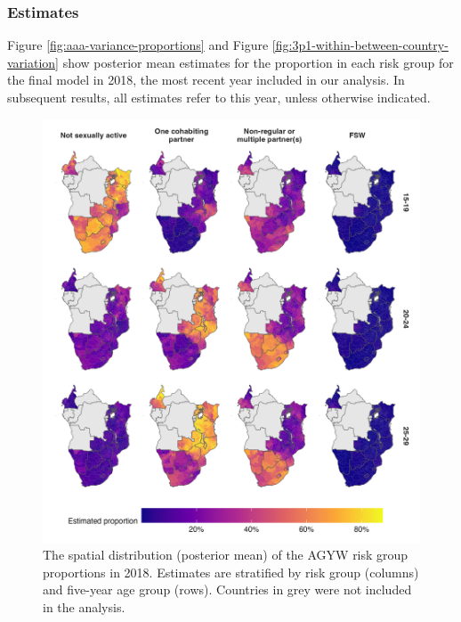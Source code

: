 \documentclass[a4paper, nobind]{templates/ociamthesis}
\begin{document}
\hypertarget{estimates}{%
\subsubsection{Estimates}\label{estimates}}

Figure \ref{fig:aaa-variance-proportions} and Figure \ref{fig:3p1-within-between-country-variation} show posterior mean estimates for the proportion in each risk group for the final model in 2018, the most recent year included in our analysis.
In subsequent results, all estimates refer to this year, unless otherwise indicated.



\begin{figure}

{\centering \includegraphics[width=0.95\linewidth]{resources/multi-agyw/20230627-144735-3da88508/depends/3p1-continental-map} 

}

\caption{The spatial distribution (posterior mean) of the AGYW risk group proportions in 2018. Estimates are stratified by risk group (columns) and five-year age group (rows). Countries in grey were not included in the analysis.}\label{fig:3p1-continental-map}
\end{figure}
\end{document}
